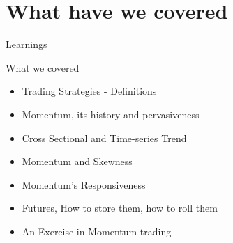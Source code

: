 \section{What have we covered}
\begin{frame}{Learnings}
\begin{alertblock}{What we covered}
    \begin{itemize}
        \item Trading Strategies - Definitions
        \item Momentum, its history and pervasiveness
        \item Cross Sectional and Time-series Trend
        \item Momentum and Skewness
        \item Momentum's Responsiveness
        \item Futures, How to store them, how to roll them
        \item An Exercise in Momentum trading
    \end{itemize}
\end{alertblock}
\end{frame}


